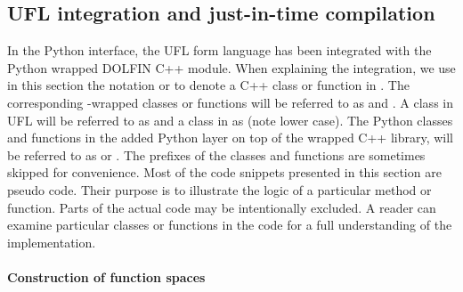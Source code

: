 \subsection{UFL integration and just-in-time compilation}

In the Python interface, the UFL form language has been integrated
with the Python wrapped DOLFIN C++ module.  When explaining the
integration, we use in this section the notation 
or  to denote a C++ class or function in \dolfin. The
corresponding \swig-wrapped classes or functions will be referred to
as  and . A class in UFL will be referred
to as  and a class in \ufc as  (note lower
case). The Python classes and functions in the added Python layer on
top of the wrapped C++ library, will be referred to as 
or . The prefixes of the classes and functions are
sometimes skipped for convenience. Most of the code snippets presented
in this section are pseudo code. Their purpose is to illustrate the
logic of a particular method or function. Parts of the actual code may
be intentionally excluded. A reader can examine particular classes or
functions in the code for a full understanding of the implementation.

\paragraph{Construction of function spaces}


